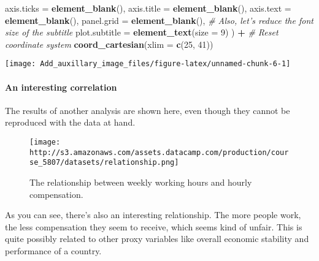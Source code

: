 \documentclass[]{article}
\newenvironment{Shaded}{\begin{snugshade}}{\end{snugshade}}
\newcommand{\KeywordTok}[1]{\textcolor[rgb]{0.13,0.29,0.53}{\textbf{#1}}}
\newcommand{\DataTypeTok}[1]{\textcolor[rgb]{0.13,0.29,0.53}{#1}}
\newcommand{\DecValTok}[1]{\textcolor[rgb]{0.00,0.00,0.81}{#1}}
\newcommand{\StringTok}[1]{\textcolor[rgb]{0.31,0.60,0.02}{#1}}
\newcommand{\CommentTok}[1]{\textcolor[rgb]{0.56,0.35,0.01}{\textit{#1}}}
\newcommand{\OperatorTok}[1]{\textcolor[rgb]{0.81,0.36,0.00}{\textbf{#1}}}
\newcommand{\NormalTok}[1]{#1}
\let\oldparagraph\paragraph
\renewcommand{\paragraph}[1]{\oldparagraph{#1}\mbox{}}
\begin{document}
\begin{Shaded}
\begin{Highlighting}[]
    \DataTypeTok{axis.ticks =} \KeywordTok{element_blank}\NormalTok{(),}
    \DataTypeTok{axis.title =} \KeywordTok{element_blank}\NormalTok{(),}
    \DataTypeTok{axis.text =} \KeywordTok{element_blank}\NormalTok{(),}
    \DataTypeTok{panel.grid =} \KeywordTok{element_blank}\NormalTok{(),}
    \CommentTok{# Also, let's reduce the font size of the subtitle}
    \DataTypeTok{plot.subtitle =} \KeywordTok{element_text}\NormalTok{(}\DataTypeTok{size =} \DecValTok{9}\NormalTok{)}
\NormalTok{  ) }\OperatorTok{+}
\StringTok{  }\CommentTok{# Reset coordinate system}
\StringTok{  }\KeywordTok{coord_cartesian}\NormalTok{(}\DataTypeTok{xlim =} \KeywordTok{c}\NormalTok{(}\DecValTok{25}\NormalTok{, }\DecValTok{41}\NormalTok{))}
\end{Highlighting}
\end{Shaded}

\begin{center}\texttt{[image: Add\_auxillary\_image\_files/figure-latex/unnamed-chunk-6-1]} \end{center}

\paragraph{An interesting correlation}\label{an-interesting-correlation}

The results of another analysis are shown here, even though they cannot
be reproduced with the data at hand.

\begin{figure}
\centering
\texttt{[image: http://s3.amazonaws.com/assets.datacamp.com/production/course\_5807/datasets/relationship.png]}
\caption{The relationship between weekly working hours and hourly
compensation.}
\end{figure}

As you can see, there's also an interesting relationship. The more
people work, the less compensation they seem to receive, which seems
kind of unfair. This is quite possibly related to other proxy variables
like overall economic stability and performance of a country.
\end{document}
